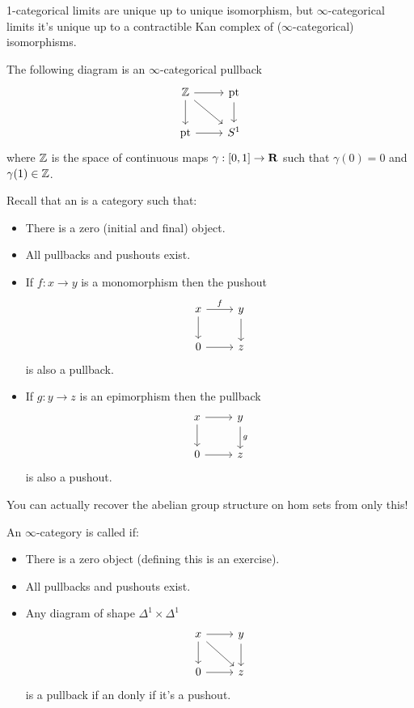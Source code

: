 1-categorical limits are unique up to unique isomorphism, but $\infty$-categorical limits
it's unique up to a contractible Kan complex of ($\infty$-categorical) isomorphisms.

\begin{example}
	The following diagram is an $\infty$-categorical pullback
	\[
		\begin{tikzcd}
			\Z \ar[r] \ar[d] \ar[dr] & \text{pt} \ar[d] \\
			\text{pt} \ar[r] & S^{1}
		\end{tikzcd}
	\]
	where $\mathbb Z$ is the space of continuous maps $\gamma:[0,1]\to \R$ such that $\gamma(0)=0$
	and $\gamma(1)\in \mathbb Z$.
\end{example}

Recall that an  is a category such that:
\begin{itemize}
	\item There is a zero (initial and final) object.
	\item All pullbacks and pushouts exist.
	\item If $f:x\to y$ is a monomorphism then the pushout
		\[
			\begin{tikzcd}
				x \ar[r,"f"] \ar[d] & y \ar[d] \\
				0 \ar[r] & z
			\end{tikzcd}
		\]
		is also a pullback.
	\item If $g:y\to z$ is an epimorphism then the pullback
		\[
			\begin{tikzcd}
				x \ar[r] \ar[d] & y \ar[d,"g"] \\
				0 \ar[r] & z
			\end{tikzcd}
		\]
		is also a pushout.
\end{itemize}
\begin{remark}
	You can actually recover the abelian group structure on hom sets from only this!
\end{remark}
\begin{definition}
	An $\infty$-category is called  if:
	\begin{itemize}
		\item There is a zero object (defining this is an exercise).
		\item All pullbacks and pushouts exist.
		\item Any diagram of shape $\Delta^{1}\times \Delta^{1}$
			\[
				\begin{tikzcd}
					x \ar[r] \ar[dr] \ar[d] & y \ar[d] \\
					0 \ar[r] & z
				\end{tikzcd}
			\]
			is a pullback if an donly if it's a pushout.
	\end{itemize}
\end{definition}
